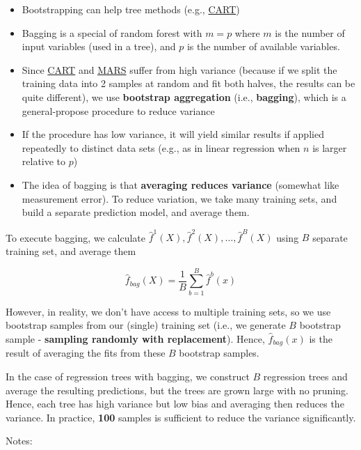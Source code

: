 \documentclass[
]{book}
\begin{document}
\begin{itemize}
\item
  Bootstrapping can help tree methods (e.g., \protect\hyperlink{classification-and-regression-trees}{CART})
\item
  Bagging is a special of random forest with \(m = p\) where \(m\) is the number of input variables (used in a tree), and \(p\) is the number of available variables.
\item
  Since \protect\hyperlink{classification-and-regression-trees}{CART} and \protect\hyperlink{multivariate-adaptive-regression-splines}{MARS} suffer from high variance (because if we split the training data into 2 samples at random and fit both halves, the results can be quite different), we use \textbf{bootstrap aggregation} (i.e., \textbf{bagging}), which is a general-propose procedure to reduce variance
\item
  If the procedure has low variance, it will yield similar results if applied repeatedly to distinct data sets (e.g., as in linear regression when \(n\) is larger relative to \(p\))
\item
  The idea of bagging is that \textbf{averaging reduces variance} (somewhat like measurement error). To reduce variation, we take many training sets, and build a separate prediction model, and average them.
\end{itemize}

To execute bagging, we calculate \(\hat{f}^1(X),\hat{f}^2(X), \dots, \hat{f}^B(X)\) using \(B\) separate training set, and average them

\[
\hat{f}_{bag} (X) = \frac{1}{B} \sum_{b=1}^B \hat{f}^b (x)
\]

However, in reality, we don't have access to multiple training sets, so we use bootstrap samples from our (single) training set (i.e., we generate \(B\) bootstrap sample - \textbf{sampling randomly with replacement}). Hence, \(\hat{f}_{bag}(x)\) is the result of averaging the fits from these \(B\) bootstrap samples.

In the case of regression trees with bagging, we construct \(B\) regression trees and average the resulting predictions, but the trees are grown large with no pruning. Hence, each tree has high variance but low bias and averaging then reduces the variance. In practice, \textbf{100} samples is sufficient to reduce the variance significantly.

Notes:
\end{document}
